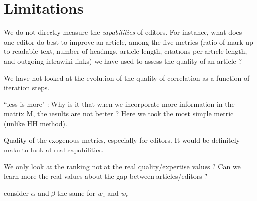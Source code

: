 \section{Limitations}
\label{limitations}
We do not directly measure the {\it capabilities} of editors. For instance, what does one editor do best to improve an article, among the five metrics (ratio of mark-up to readable text, number of headings, article length, citations per article length, and outgoing intrawiki links) we have used to assess the quality of an article ? 

We have not looked at the evolution of the quality of correlation as a function of iteration steps.

``less is more" : Why is it that when we incorporate more information in the matrix M, the results are not better ? Here we took the most simple metric (unlike HH method).

Quality of the exogenous metrics, especially for editors. It would be definitely make to look at real capabilities.

We only look at the ranking not at the real quality/expertise values ? Can we learn more the real values about the gap between articles/editors ?

consider $\alpha$ and $\beta$ the same for $w_{a}$ and $w_{e}$